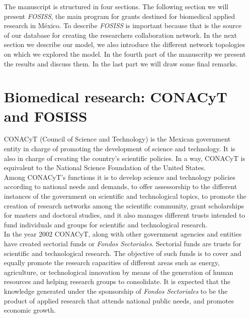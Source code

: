 The manuscript is structured in four sections. The following section we will present \textit{FOSISS}, the main program for grants destined for biomedical applied research in M\'exico. To describe \textit{FOSISS} is important because that is the source of our database for creating the researchers collaboration network. In the next section we describe our model, we also introduce the different network topologies on which we explored the model. In the fourth part of the manuscritp we present the results and discuss them. In the last part we will draw some final remarks.

\section{Biomedical research: CONACyT and FOSISS}
\label{sec:1}
CONACyT (Council of Science and Technology) is the Mexican government
entity in charge of promoting the development of science and 
technology. It is also in charge of creating the country's scientific
policies. In a way, CONACyT is equivalent to the National Science
Foundation of the United States.\\

Among CONACyT's functions it is to develop science and technology
policies according to national needs and demands, to offer
assessorship to the different instances of the government on
scientific and technological topics, to promote the creation of
research networks among the scientific community, grant scholarships
for masters and doctoral studies, and it also manages different trusts
intended to fund individuals and groups for scientific and
technological research.\\

In the year 2002 CONACyT, along with other government agencies and
entities have created sectorial funds or \emph{Fondos Sectoriales}.
Sectorial funds are trusts for scientific and technological research.
The objective of such funds is to cover and equally promote the
research capacities of different areas such as energy, agriculture, or
technological innovation by means of the generation of human resources
and helping research groups to consolidate. It is expected that the
knowledge generated under the sponsorship of \emph{Fondos Sectoriales}
to be the product of applied research that attends national public
needs, and promotes economic growth.\\

